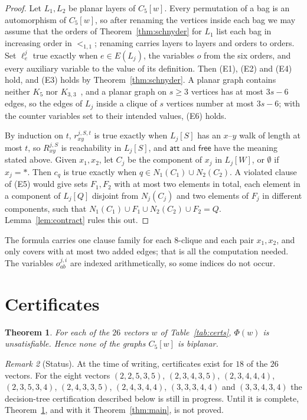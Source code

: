 \documentclass[11pt]{amsart}
\newtheorem{theorem}{Theorem}[section]
\theoremstyle{definition}
\theoremstyle{remark}
\newtheorem{remark}[theorem]{Remark}
\numberwithin{equation}{section}
\newcommand{\cw}{C_5[w]}
\newcommand{\lit}[1]{\mathsf{#1}}
\begin{document}
\begin{proof}
Let $L_1,L_2$ be planar layers of $\cw$. Every permutation of a bag is an automorphism of $\cw$, so after renaming the vertices inside each bag we may assume that the orders of Theorem~\ref{thm:schnyder} for $L_1$ list each bag in increasing order in $<_{1,1}$; renaming carries layers to layers and orders to orders. Set $\ell^j_e$ true exactly when $e\in E(L_j)$, the variables $o$ from the six orders, and every auxiliary variable to the value of its definition. Then (E1), (E2) and (E4) hold, and (E3) holds by Theorem~\ref{thm:schnyder}. A planar graph contains neither $K_5$ nor $K_{3,3}$~\cite{Ku}, and a planar graph on $s\ge3$ vertices has at most $3s-6$ edges, so the edges of $L_j$ inside a clique of $s$ vertices number at most $3s-6$; with the counter variables set to their intended values, (E6) holds.

By induction on $t$, $r^{j,S,t}_{xy}$ is true exactly when $L_j[S]$ has an $x$--$y$ walk of length at most $t$, so $R^{j,S}_{xy}$ is reachability in $L_j[S]$, and $\lit{att}$ and $\lit{free}$ have the meaning stated above. Given $x_1,x_2$, let $C_j$ be the component of $x_j$ in $L_j[W]$, or $\emptyset$ if $x_j=\ast$. Then $c_q$ is true exactly when $q\in N_1(C_1)\cup N_2(C_2)$. A violated clause of (E5) would give sets $F_1,F_2$ with at most two elements in total, each element in a component of $L_j[Q]$ disjoint from $N_j(C_j)$ and two elements of $F_j$ in different components, such that $N_1(C_1)\cup F_1\cup N_2(C_2)\cup F_2=Q$. Lemma~\ref{lem:contract} rules this out.
\end{proof}

The formula carries one clause family for each $8$-clique and each pair $x_1,x_2$, and only covers with at most two added edges; that is all the computation needed. The variables $o^{j,i}_{ab}$ are indexed arithmetically, so some indices do not occur.

\section{Certificates}\label{sec:certificates}

\begin{theorem}\label{thm:unsat}
For each of the $26$ vectors $w$ of Table~\ref{tab:certs}, $\Phi(w)$ is unsatisfiable. Hence none of the graphs $\cw$ is biplanar.
\end{theorem}

\begin{remark}[Status]\label{rem:status}
At the time of writing, certificates exist for $18$ of the $26$ vectors. For the eight vectors $(2,2,5,3,5)$, $(2,3,4,3,5)$, $(2,3,4,4,4)$, $(2,3,5,3,4)$, $(2,4,3,3,5)$, $(2,4,3,4,4)$, $(3,3,3,4,4)$ and $(3,3,4,3,4)$ the decision-tree certification described below is still in progress. Until it is complete, Theorem~\ref{thm:unsat}, and with it Theorem~\ref{thm:main}, is not proved.
\end{remark}
\end{document}
